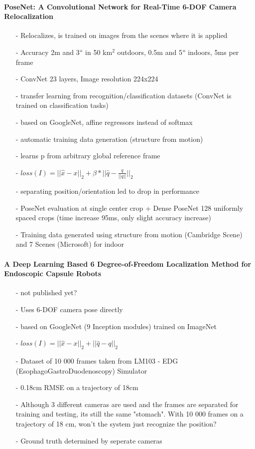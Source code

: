\documentclass{article}
\begin{document}
	\paragraph{PoseNet: A Convolutional Network for Real-Time 6-DOF Camera Relocalization \cite{Kendall}}
	\begin{itemize}
			\item[-] Relocalizes, is trained on images from the scenes where it is applied	\item[-] Accuracy 2m and 3$\degree$  in 50 km$^2$ outdoors, 0.5m and 5$\degree$ indoors, 5ms per frame
		\item[-] ConvNet 23 layers, Image resolution 224x224
		\item[-] transfer learning from recognition/classification datasets (ConvNet is trained on classification tasks)
		\item[-] based on GoogleNet, affine regressors instead of softmax\item[-] automatic training data generation (structure from motion)
		\item[-] learns p from arbitrary global reference frame
		\item[-] $loss(I) = || \hat{x}-x||_2 + \beta*||\hat{q}-\frac{q}{||q||}||_2$
		\item[-] separating position/orientation led to drop in performance
		\item[-] PoseNet evaluation at single center crop + Dense PoseNet 128 uniformly spaced crops (time increase 95ms, only slight accuracy increase)
		\item[-] Training data generated using structure from motion (Cambridge Scene) and 7 Scenes (Microsoft) for indoor

	\end{itemize}
	 \paragraph{A Deep Learning Based 6 Degree-of-Freedom
	 	Localization Method for Endoscopic Capsule Robots \cite{Turan2017}}
	 	\begin{itemize}
	 		\item[-] not published yet?
	 		\item[-] Uses 6-DOF camera pose directly
	 		\item[-] based on GoogleNet (9 Inception modules) trained on ImageNet
	 		\item[-] $loss(I) = ||\hat{x}-x||_2 + ||\hat{q}-q||_2$
	 		\item[-] Dataset of 10 000 frames taken from LM103 - EDG (EsophagoGastroDuodenoscopy) Simulator
	 		\item[-] 0.18cm RMSE on a trajectory of 18cm
	 		\item[-] Although 3 different cameras are used and the frames are separated for training and testing, its still the same "stomach". With 10 000 frames on a trajectory of 18 cm, won't the system just recognize the position?
	 		\item[-] Ground truth determined by seperate cameras 
	 	\end{itemize}
\end{document}
